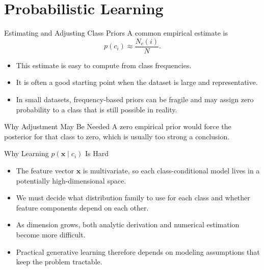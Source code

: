 \documentclass[10pt]{beamer}
\begin{document}
\section{Probabilistic Learning}

\begin{frame}{Estimating and Adjusting Class Priors}
  \justifying
  A common empirical estimate is
  \[
    p(c_i) \approx \frac{N_c(i)}{N}.
  \]
  \begin{itemize}
    \item This estimate is easy to compute from class frequencies.
    \item It is often a good starting point when the dataset is large and representative.
    \item In small datasets, frequency-based priors can be fragile and may assign zero probability to a class that is still possible in reality.
  \end{itemize}
  \begin{warningbox}{Why Adjustment May Be Needed}
    A zero empirical prior would force the posterior for that class to zero, which is usually too strong a conclusion.
  \end{warningbox}
\end{frame}

\begin{frame}{Why Learning $p(\bm{x}\mid c_i)$ Is Hard}
  \justifying
  \begin{itemize}
    \item The feature vector $\bm{x}$ is multivariate, so each class-conditional model lives in a potentially high-dimensional space.
    \item We must decide what distribution family to use for each class and whether feature components depend on each other.
    \item As dimension grows, both analytic derivation and numerical estimation become more difficult.
    \item Practical generative learning therefore depends on modeling assumptions that keep the problem tractable.
  \end{itemize}
\end{frame}
\end{document}

